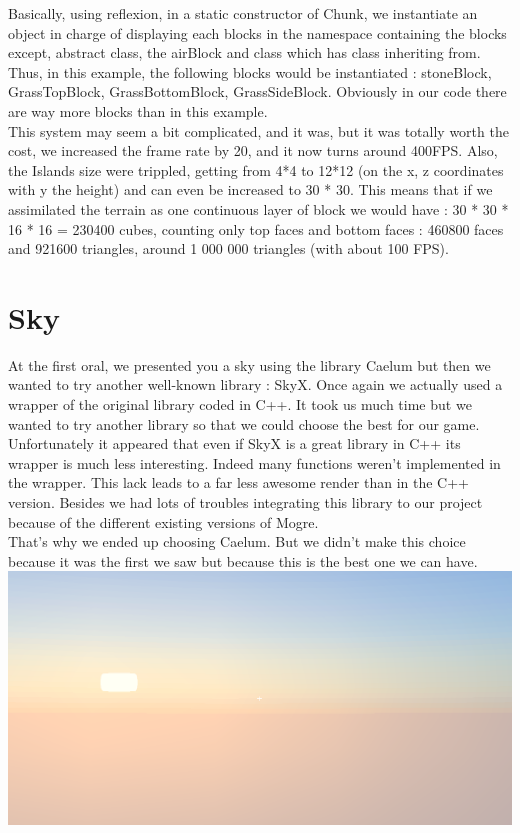 \documentclass[article]{report}             %
\begin{document}
Basically, using reflexion, in a static constructor of Chunk, we instantiate an object in charge of displaying each blocks in the namespace containing the blocks except, abstract class, the airBlock and class which has class inheriting from.\\
Thus, in this example, the following blocks would be instantiated : stoneBlock, GrassTopBlock, GrassBottomBlock, GrassSideBlock. Obviously in our code there are way more blocks 
than in this example.\\


This system may seem a bit complicated, and it was, but it was totally worth the cost, we increased the frame rate by 20, and it now turns around 400FPS. Also, the Islands size were trippled, getting from 4*4 to 12*12 (on the x, z coordinates with y the height) and can even be increased to 30 * 30. This means that if we assimilated the terrain as one continuous layer of block we would have : 	30 * 30 * 16 * 16 = 230400 cubes, counting only top faces and bottom faces : 460800 faces and 921600 triangles, around 1 000 000 triangles (with about 100 FPS).
			
			\section{Sky}
				At the first oral, we presented you a sky using the library Caelum but then we wanted to try another well-known library : SkyX. Once again we actually used a wrapper of the original library coded in C++. It took us much time but we wanted to try another library so that we could choose the best for our game.\\
				
Unfortunately it appeared that even if SkyX is a great library in C++ its wrapper is much less interesting. Indeed many functions weren't implemented in the wrapper. This lack leads to a far less awesome render than in the C++ version. Besides we had lots of troubles integrating this library to our project because of the different existing versions of Mogre.\\

That's why we ended up choosing Caelum. But we didn't make this choice because it was the first we saw but because this is the best one we can have. \\

				\includegraphics[width = 16cm]{images/Graphics/sky.png}
\end{document}
